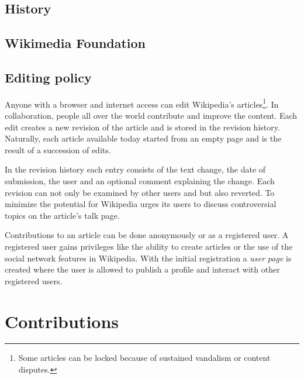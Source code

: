 \subsection{History}


\subsection{Wikimedia Foundation}


\subsection{Editing policy}


Anyone with a browser and internet access can edit Wikipedia's articles\footnote{Some articles can be locked because of sustained vandalism or content disputes.\cite{wpprotectionpolicy}}.
In collaboration, people all over the world contribute and improve the content. 
Each edit creates a new revision of the article and is stored in the revision history.
Naturally, each article available today started from an empty page and is the result of a succession of edits.

In the revision history each entry consists of the text change, the date of submission, the user and an optional comment explaining the change.
Each revision can not only be examined by other users and but also reverted.
To minimize the potential for \cite{suh2007us} Wikipedia urges its users to discuss controversial topics on the article's talk page.


Contributions to an article can be done anonymously or as a registered user.
A registered user gains privileges like the ability to create articles or the use of the social network features in Wikipedia.
With the initial registration a \emph{user page} is created where the user is allowed to publish a profile and interact with other registered users.\cite{wikiwhyaccount}


\section{Contributions}\label{sec:contribution}

